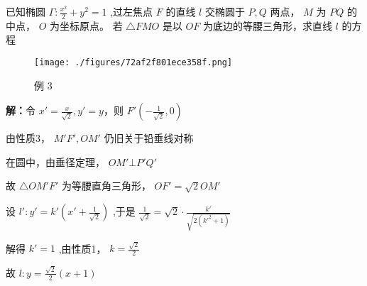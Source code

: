 \begin{example}{}
已知椭圆 $\displaystyle{\Gamma:\frac{x^2}{2}+y^2=1}$ ,过左焦点 $\displaystyle{F}$ 的直线 $\displaystyle{l}$ 交椭圆于 $\displaystyle{P,Q}$ 两点， $\displaystyle{M}$ 为 $\displaystyle{PQ}$ 的中点， $\displaystyle{O}$ 为坐标原点。 若 $\displaystyle{\triangle FMO}$ 是以 $\displaystyle{OF}$ 为底边的等腰三角形，求直线 $\displaystyle{l}$  的方程
\begin{figure}[ht]
\centering
\texttt{[image: ./figures/72af2f801ece358f.png]}
\caption{例 3} \label{fig_affine_10}
\end{figure}
\textbf{解：}令 $\displaystyle{x'=\frac{x}{\sqrt{2}},y'=y}$，则 $\displaystyle{F'\left(-\frac{1}{\sqrt{2}},0\right)}$

由性质3， $\displaystyle{M'F',OM'}$ 仍旧关于铅垂线对称

在圆中，由垂径定理， $\displaystyle{OM'\bot P'Q'}$

故 $\displaystyle{\triangle OM'F'}$ 为等腰直角三角形， $\displaystyle{OF'=\sqrt{2} OM'}$

设 $\displaystyle{l':y'=k'\left(x'+\frac{1}{\sqrt{2}}\right)}$ ,于是 $\displaystyle{\frac{1}{\sqrt{2}}=\sqrt{2}\cdot \frac{k'}{\sqrt{2(k'^2+1)}}}$

解得 $\displaystyle{k'=1}$ ,由性质1， $\displaystyle{k=\frac{\sqrt{2}}{2}}$

故 $\displaystyle{l:y=\frac{\sqrt{2}}{2}(x+1)}$ 
\end{example}

